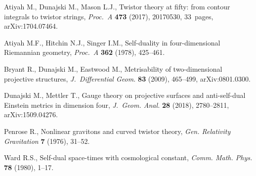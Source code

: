 
Atiyah M., Dunajski M., Mason L.J., Twistor theory at fifty: from contour
 integrals to twistor strings, \textit{Proc.~A} \textbf{473} (2017), 20170530,
 33~pages, arXiv:1704.07464.


Atiyah M.F., Hitchin N.J., Singer I.M., Self-duality in four-dimensional
 {R}iemannian geometry, \textit{Proc.~A} \textbf{362} (1978), 425--461.


Bryant R., Dunajski M., Eastwood M., Metrisability of two-dimensional
 projective structures, \textit{J.~Differential Geom.} \textbf{83} (2009),
 465--499, arXiv:0801.0300.


Dunajski M., Mettler T., Gauge theory on projective surfaces and anti-self-dual
 {E}instein metrics in dimension four, \textit{J.~Geom. Anal.} \textbf{28}
 (2018), 2780--2811, arXiv:1509.04276.


Penrose R., Nonlinear gravitons and curved twistor theory, \textit{Gen.
 Relativity Gravitation} \textbf{7} (1976), 31--52.


Ward R.S., Self-dual space-times with cosmological constant, \textit{Comm.
 Math. Phys.} \textbf{78} (1980), 1--17.

